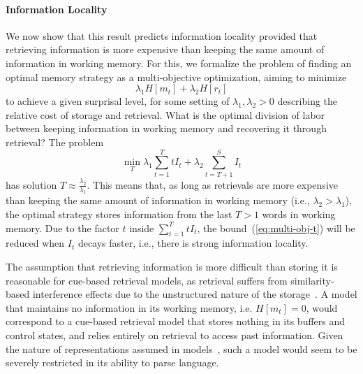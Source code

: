 \documentclass[11pt,letterpaper]{article}
\begin{document}
\paragraph{Information Locality}
We now show that this result predicts information locality provided that retrieving information is more expensive than keeping the same amount of information in working memory.
For this, we formalize the problem of finding an optimal memory strategy as a multi-objective optimization, aiming to minimize
\begin{equation}
	\lambda_1 H[m_t] + \lambda_2 H[r_t]
\end{equation}
to achieve a given surprisal level, for some setting of $\lambda_1, \lambda_2 > 0$ describing the relative cost of storage and retrieval.
What is the optimal division of labor between keeping information in working memory and recovering it through retrieval?
The problem
\begin{equation}\label{eq:multi-obj-t}
	\min_{T} \lambda_1 \sum_{t=1}^T t I_t + \lambda_2 \sum_{t=T+1}^S I_t
\end{equation}
has solution $T \approx \frac{\lambda_2}{\lambda_1}$. %
This means that, as long as retrievals are more expensive than keeping the same amount of information in working memory (i.e., $\lambda_2 > \lambda_1$), the optimal strategy stores information from the last $T > 1$ words in working memory.
Due to the factor $t$ inside $\sum_{t=1}^T t I_t$, the bound~(\ref{eq:multi-obj-t}) will be reduced when $I_t$ decays faster, i.e., there is strong information locality.

The assumption that retrieving information is more difficult than storing it is reasonable for cue-based retrieval models, as retrieval suffers from similarity-based interference effects due to the unstructured nature of the storage~\citep{lewis-activation-based-2005}.
A model that maintains no information in its working memory, i.e. $H[m_t]=0$, would correspond to a cue-based retrieval model that stores nothing in its buffers and control states, and relies entirely on retrieval to access past information.
Given the nature of representations assumed in models~\citep{lewis-activation-based-2005}, such a model would seem to be severely restricted in its ability to parse language.

\end{document}
